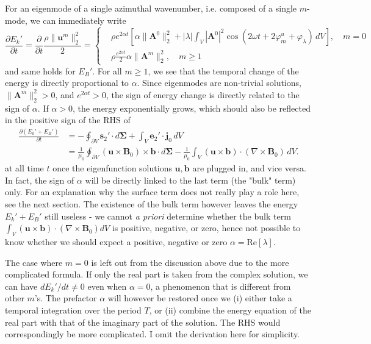 %
For an eigenmode of a single azimuthal wavenumber, i.e. composed of a single $m$-mode, we can immediately write
%
\[
    \frac{\partial E_{k}'}{\partial t} = \frac{\partial}{\partial t} \frac{\rho \|\mathbf{u}^m\|_2^2}{2} = \left\{\begin{aligned}
        &\rho e^{2\alpha t} \left[\alpha \|\mathbf{A}^0\|_2^2 + |\lambda| \int_V |\mathbf{A}^0|^2 \cos(2\omega t + 2 \varphi_m^u + \varphi_\lambda) \, dV \right],\quad m=0 \\ 
        &\rho \frac{e^{2\alpha t}}{2} \alpha \|\mathbf{A}^m\|_2^2,\quad m \geq 1
    \end{aligned}\right.
\]
%
and same holds for $E_B'$. For all $m \geq 1$, we see that the temporal change of the energy is directly proportional to $\alpha$. Since eigenmodes are non-trivial solutions, $\|\mathbf{A}^m\|_2^2 
> 0$, and $e^{2\alpha t} > 0$, the sign of energy change is directly related to the sign of $\alpha$. If $\alpha > 0$, the energy exponentially grows, which should also be reflected in the positive sign of the RHS of
%
\[\begin{aligned}
    \frac{\partial (E_k' + E_B')}{\partial t} &= - \oint_{\partial V} \mathbf{s}_2' \cdot d\boldsymbol{\Sigma} + \int_V \mathbf{e}_2'\cdot \mathbf{j}_0 \, dV \\
    &= \frac{1}{\mu_0} \oint_{\partial V} (\mathbf{u} \times \mathbf{B}_0) \times \mathbf{b} \cdot d\boldsymbol{\Sigma} - \frac{1}{\mu_0}\int_V (\mathbf{u} \times \mathbf{b})\cdot (\nabla\times \mathbf{B}_0) \, dV.
\end{aligned}\]
%
at all time $t$ once the eigenfunction solutions $\mathbf{u}, \mathbf{b}$ are plugged in, and vice versa. In fact, the sign of $\alpha$ will be directly linked to the last term (the "bulk" term) only. For an explanation why the surface term does not really play a role here, see the next section.
The existence of the bulk term however leaves the energy $E_k' + E_B'$ still useless - we cannot \textit{a priori} determine whether the bulk term $\int_V (\mathbf{u}\times \mathbf{b})\cdot (\nabla\times \mathbf{B}_0) dV$ is positive, negative, or zero, hence not possible to know whether we should expect a positive, negative or zero $\alpha = \mathrm{Re}[\lambda]$.

The case where $m=0$ is left out from the discussion above due to the more complicated formula. If only the real part is taken from the complex solution, we can have $dE_k'/dt \neq 0$ even when $\alpha = 0$, a phenomenon that is different from other $m$'s.
The prefactor $\alpha$ will however be restored once we (i) either take a temporal integration over the period $T$, or (ii) combine the energy equation of the real part with that of the imaginary part of the solution. The RHS would correspondingly be more complicated. I omit the derivation here for simplicity.

